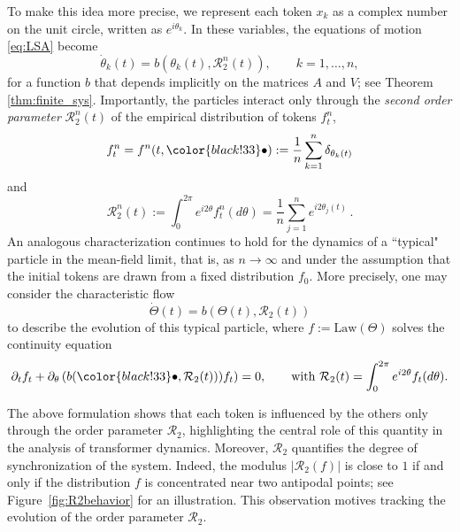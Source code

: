 \documentclass[10pt]{article}
\theoremstyle{definition}
\theoremstyle{definition}
\numberwithin{equation}{section}
\newcommand{\CR}{\mathcal{R}}
\newcommand{\Law}{\mathrm{Law}}
\newcommand{\dummy}{\mathord{\color{black!33}\bullet}}
\newcommand{\thetaMF}{\Theta}
\begin{document}
To make this idea more precise, we represent each token $x_k$ as a complex number on the unit circle, written as $e^{i\theta_k}$. In these variables, the equations of motion \eqref{eq:LSA} become
\begin{equation} \label{eq:particle_interact_intro}
    \dot{\theta}_k(t) = b(\theta_k(t), \CR_2^n(t)), \qquad k=1, \dots, n,
\end{equation}
for a function $b$ that depends implicitly on the matrices $A$ and $V$; see Theorem \ref{thm:finite_sys}.
Importantly, the particles interact only through the \emph{second order parameter} $\CR_2^n(t)$ of the empirical distribution of tokens $f^n_t$,
\begin{equation*}
f^n_t = f^n(t, \dummy) := \frac{1}{n} \sum_{k=1}^n \delta_{\theta_k(t)}
\end{equation*}
and
\begin{equation}
    \CR_2^n(t)
    := \int_{0}^{2\pi} e^{i2\theta} f^n_t(d\theta)
    = \frac{1}{n} \sum_{j=1}^n e^{i2\theta_j(t)} \, .
\end{equation}
An analogous characterization continues to hold for the dynamics of a ``typical" particle in the mean-field limit, that is, as $n \rightarrow \infty$ and under the assumption that the initial tokens are drawn from a fixed distribution $f_0$. More precisely, one may consider the characteristic flow 
\begin{equation*}
    \dot{\thetaMF}(t) = b \left(\thetaMF(t), \CR_2(t) \right)
\end{equation*}
to describe the evolution of this typical particle, where $f := \Law(\thetaMF)$ solves the continuity equation
\begin{equation*}
    \partial_t f_t + \partial_{\theta} \left( b(\dummy, \CR_2(t))) f_t \right) = 0, \qquad \text{with } \CR_2 (t) = \int_0^{2\pi} e^{i2\theta} f_t( d\theta).
\end{equation*}

The above formulation shows that each token is influenced by the others only through the order parameter $\CR_2$, highlighting the central role of this quantity in the analysis of transformer dynamics. 
Moreover, $\CR_2$ quantifies the degree of synchronization of the system.
Indeed, the modulus $|\CR_2(f)|$ is close to $1$ if and only if the distribution $f$ is concentrated near two antipodal points; see Figure~\ref{fig:R2behavior} for an illustration.
This observation motives tracking the evolution of the order parameter $\CR_2$.
\end{document}
